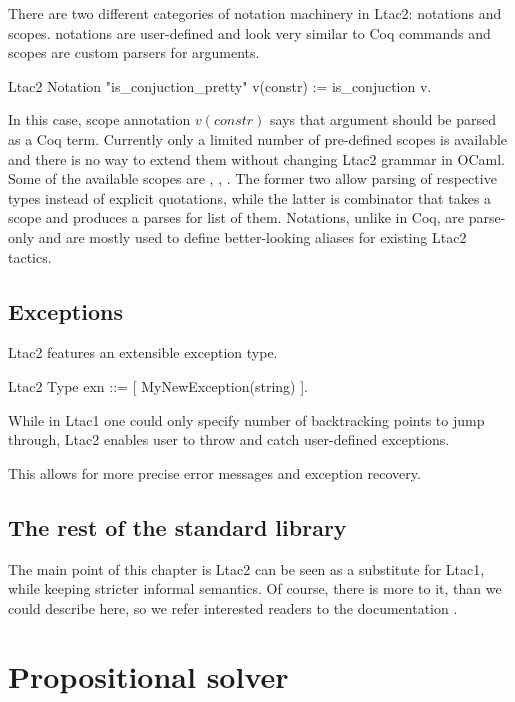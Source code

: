 There are two different categories of notation machinery in Ltac2: notations and scopes.
notations are user-defined and look very similar to Coq  commands and scopes are custom parsers for arguments.
\begin{coq}
  Ltac2 Notation "is_conjuction_pretty" v(constr) := is_conjuction v.
\end{coq}
In this case, scope annotation \(v(constr)\) says that argument  should be parsed as a Coq term.
Currently only a limited number of pre-defined scopes is available and there is no way to extend them without changing Ltac2 grammar in OCaml.
Some of the available scopes are , , .
The former two allow parsing of respective types instead of explicit quotations, while the latter is combinator that takes a scope and produces a parses for list of them.
Notations, unlike in Coq, are parse-only and are mostly used to define better-looking aliases for existing Ltac2 tactics.

\subsection{Exceptions}
\label{subsec:ltac2-exceptions}

Ltac2 features an extensible exception type.
\begin{coq}
Ltac2 Type exn ::= [ MyNewException(string) ].
\end{coq}
While in Ltac1 one could only specify number of backtracking points to jump through, Ltac2 enables user to throw and catch user-defined exceptions.

This allows for more precise error messages and exception recovery.

\subsection{The rest of the standard library}
The main point of this chapter is Ltac2 can be seen as a substitute for Ltac1, while keeping stricter informal semantics.
Of course, there is more to it, than we could describe here, so we refer interested readers to the documentation \cite[Section 3.3.2]{thecoqdevelopmentteamCoqProofAssistant2020}.

\section{Propositional solver}
\label{sec:propositional-solver}


